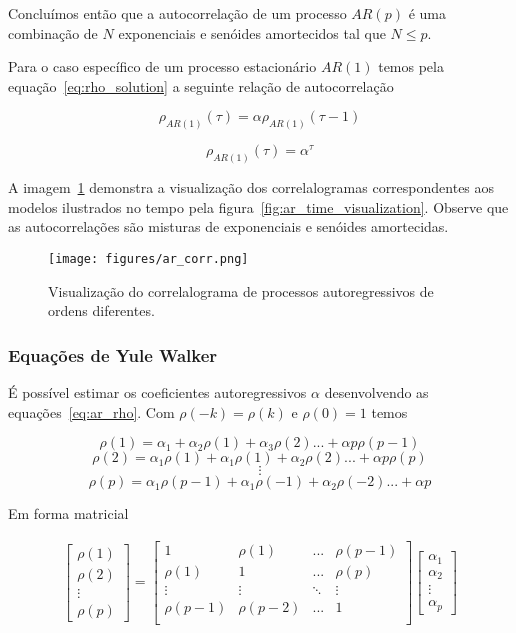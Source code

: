 Concluímos então que a autocorrelação de um processo $AR(p)$ é uma combinação
de $N$ exponenciais e senóides amortecidos tal que $N \leq p$.

Para o caso específico de um processo estacionário $AR(1)$ temos pela
equação~\ref{eq:rho_solution} a seguinte relação de autocorrelação

$$ \rho_{AR(1)}(\tau) = \alpha \rho_{AR(1)}(\tau - 1)$$

$$ \rho_{AR(1)}(\tau) = \alpha^{\tau}$$

A imagem~\ref{fig:ar_corr} demonstra a visualização dos correlalogramas
correspondentes aos modelos ilustrados no tempo pela
figura~\ref{fig:ar_time_visualization}. Observe que as autocorrelações são
misturas de exponenciais e senóides amortecidas.

\begin{figure}[H]
    \centering
    \texttt{[image: figures/ar\_corr.png]}
    \caption{Visualização do correlalograma de processos autoregressivos de
    ordens diferentes.}
    \label{fig:ar_corr}
\end{figure}

\subsubsection{Equações de Yule Walker}

É possível estimar os coeficientes autoregressivos $\alpha$ desenvolvendo as
equações~\ref{eq:ar_rho}. Com $\rho(-k) = \rho(k)$ e $\rho(0) = 1$ temos

$$\rho(1) = \alpha_{1} + \alpha_{2}\rho(1) + \alpha_{3}\rho(2) ... + \alpha{p}\rho(p-1)$$
$$\rho(2) = \alpha_{1}\rho(1) + \alpha_{1}\rho(1) + \alpha_{2}\rho(2) ... + \alpha{p}\rho(p)$$
$$\vdots$$
$$\rho(p) = \alpha_{1}\rho(p-1) + \alpha_{1}\rho(-1) + \alpha_{2}\rho(-2) ... + \alpha{p}$$

Em forma matricial

\begin{gather}\label{eq:yule_walker}
  \begin{bmatrix} \rho(1) \\ \rho(2) \\ \vdots \\ \rho(p) \end{bmatrix}
  =
  \begin{bmatrix}
      1 & \rho(1) & ... & \rho(p-1) \\
      \rho(1) & 1 & ... & \rho(p) \\
      \vdots & \vdots & \ddots & \vdots \\
      \rho(p-1) & \rho(p-2) & ... & 1 \\
  \end{bmatrix}
  \begin{bmatrix} \alpha_{1} \\ \alpha_{2} \\ \vdots \\ \alpha_{p} \end{bmatrix}
\end{gather}

